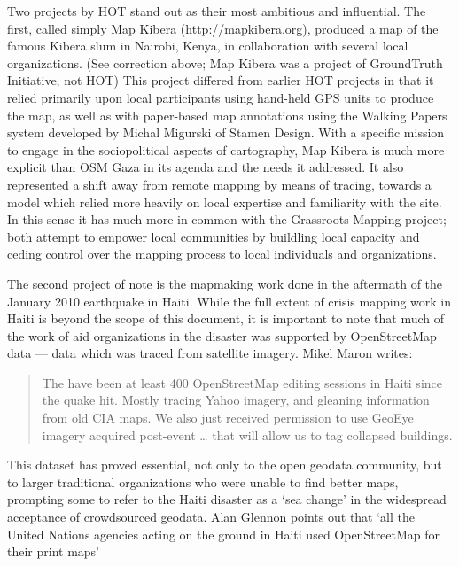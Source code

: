 \documentclass[11pt,oneside,notitlepage]{report}
\begin{document}
{{Two projects by \ac{HOT} stand out as their most ambitious and influential. The first, called simply Map Kibera (\url{http://mapkibera.org}), produced a map of the famous Kibera slum in Nairobi, Kenya, in collaboration with several local organizations. (See correction above; Map Kibera was a project of GroundTruth Initiative, not \ac{HOT}) This project differed from earlier \ac{HOT} projects in that it relied primarily upon local participants using hand-held GPS units to produce the map, as well as with paper-based map annotations using the Walking Papers system developed by Michal Migurski of Stamen Design. With a specific mission to engage in the sociopolitical aspects of cartography, Map Kibera is much more explicit than OSM Gaza in its agenda and the needs it addressed. It also represented a shift away from remote mapping by means of tracing, towards a model which relied more heavily on local expertise and familiarity with the site. In this sense it has much more in common with the Grassroots Mapping project; both attempt to empower local communities by buildling local capacity and ceding control over the mapping process to local individuals and organizations. 

The second project of note is the mapmaking work done in the aftermath of the January 2010 earthquake in Haiti. While the full extent of crisis mapping work in Haiti is beyond the scope of this document, it is important to note that much of the work of aid organizations in the disaster was supported by OpenStreetMap data --- data which was traced from satellite imagery. Mikel Maron writes: 

\begin{quote}The have been at least 400 OpenStreetMap editing sessions in Haiti since the quake hit. Mostly tracing Yahoo imagery, and gleaning information from old CIA maps. We also just received permission to use GeoEye imagery acquired post-event … that will allow us to tag collapsed buildings.\end{quote} \cite{maron2010haiti}

This dataset has proved essential, not only to the open geodata community, but to larger traditional organizations who were unable to find better maps, prompting some to refer to the Haiti disaster as a `sea change' in the widespread acceptance of crowdsourced geodata. Alan Glennon points out that `all the United Nations agencies acting on the ground in Haiti used OpenStreetMap for their print maps' \cite{glennon2010grassrootscrisis}

}}
\end{document}
